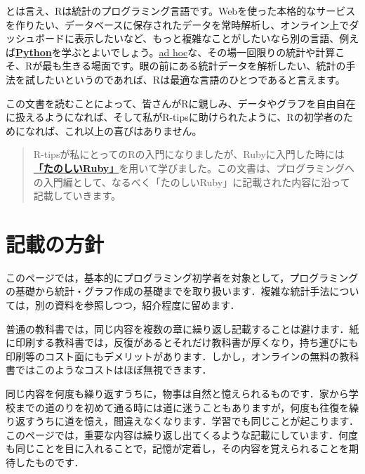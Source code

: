 \documentclass[
  letterpaper,
  DIV=11,
  numbers=noendperiod]{scrreprt}
\begin{document}
とは言え、Rは統計のプログラミング言語です。Webを使った本格的なサービスを作りたい、データベースに保存されたデータを常時解析し、オンライン上でダッシュボードに表示したいなど、もっと複雑なことがしたいなら別の言語、例えば\textbf{\href{https://www.python.org/}{Python}}を学ぶとよいでしょう。\href{https://ja.wikipedia.org/wiki/\%E3\%82\%A2\%E3\%83\%89\%E3\%83\%9B\%E3\%83\%83\%E3\%82\%AF}{ad
hoc}な、その場一回限りの統計や計算こそ、Rが最も生きる場面です。眼の前にある統計データを解析したい、統計の手法を試したいというのであれば、Rは最適な言語のひとつであると言えます。

この文書を読むことによって、皆さんがRに親しみ、データやグラフを自由自在に扱えるようになれば、そして私がR-tipsに助けられたように、Rの初学者のためになれば、これ以上の喜びはありません。

\begin{quote}
R-tipsが私にとってのRの入門になりましたが、Rubyに入門した時には\href{https://www.amazon.co.jp/\%E3\%81\%9F\%E3\%81\%AE\%E3\%81\%97\%E3\%81\%84Ruby-\%E7\%AC\%AC6\%E7\%89\%88-Informatics-IDEA-\%E9\%AB\%98\%E6\%A9\%8B/dp/4797399848}{\textbf{「たのしいRuby」}}を用いて学びました。この文書は、プログラミングへの入門編として、なるべく「たのしいRuby」に記載された内容に沿って記載していきます。
\end{quote}

\hypertarget{ux8a18ux8f09ux306eux65b9ux91dd}{%
\section*{記載の方針}\label{ux8a18ux8f09ux306eux65b9ux91dd}}


このページでは，基本的にプログラミング初学者を対象として，プログラミングの基礎から統計・グラフ作成の基礎までを取り扱います．複雑な統計手法については，別の資料を参照しつつ，紹介程度に留めます．

普通の教科書では，同じ内容を複数の章に繰り返し記載することは避けます．紙に印刷する教科書では，反復があるとそれだけ教科書が厚くなり，持ち運びにも印刷等のコスト面にもデメリットがあります．しかし，オンラインの無料の教科書ではこのようなコストはほぼ無視できます．

同じ内容を何度も繰り返すうちに，物事は自然と憶えられるものです．家から学校までの道のりを初めて通る時には道に迷うこともありますが，何度も往復を繰り返すうちに道を憶え，間違えなくなります．学習でも同じことが起こります．このページでは，重要な内容は繰り返し出てくるような記載にしています．何度も同じことを目に入れることで，記憶が定着し，その内容を覚えられることを期待したものです．
\end{document}
